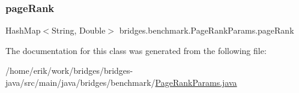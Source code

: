 \subsubsection{\texorpdfstring{page\+Rank}{pageRank}}
{\footnotesize\ttfamily Hash\+Map$<$String, Double$>$ bridges.\+benchmark.\+Page\+Rank\+Params.\+page\+Rank}



The documentation for this class was generated from the following file\+:\begin{DoxyCompactItemize}
\item 
/home/erik/work/bridges/bridges-\/java/src/main/java/bridges/benchmark/\hyperlink{_page_rank_params_8java}{Page\+Rank\+Params.\+java}\end{DoxyCompactItemize}
